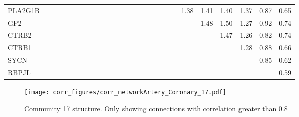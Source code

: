 \begin{longtable}{lrrrrrrrrrrrrrrrrrrrrrrrrr}
PLA2G1B  &              &              &              &              &             &             &             &             &            &            &            &            &             &             &           &             &                &           &               &      1.38 &        1.41 &        1.40 &       1.37 &        0.87 &        0.65 \\
GP2      &              &              &              &              &             &             &             &             &            &            &            &            &             &             &           &             &                &           &               &           &        1.48 &        1.50 &       1.27 &        0.92 &        0.74 \\
CTRB2    &              &              &              &              &             &             &             &             &            &            &            &            &             &             &           &             &                &           &               &           &             &        1.47 &       1.26 &        0.82 &        0.74 \\
CTRB1    &              &              &              &              &             &             &             &             &            &            &            &            &             &             &           &             &                &           &               &           &             &             &       1.28 &        0.88 &        0.66 \\
SYCN     &              &              &              &              &             &             &             &             &            &            &            &            &             &             &           &             &                &           &               &           &             &             &            &        0.85 &        0.62 \\
RBPJL    &              &              &              &              &             &             &             &             &            &            &            &            &             &             &           &             &                &           &               &           &             &             &            &             &        0.59 \\
\end{longtable}


\begin{figure}[h!]
\centering
\texttt{[image: corr\_figures/corr\_networkArtery\_Coronary\_17.pdf]}
\caption{Community 17 structure. Only showing connections with correlation greater than 0.8}
\end{figure}




